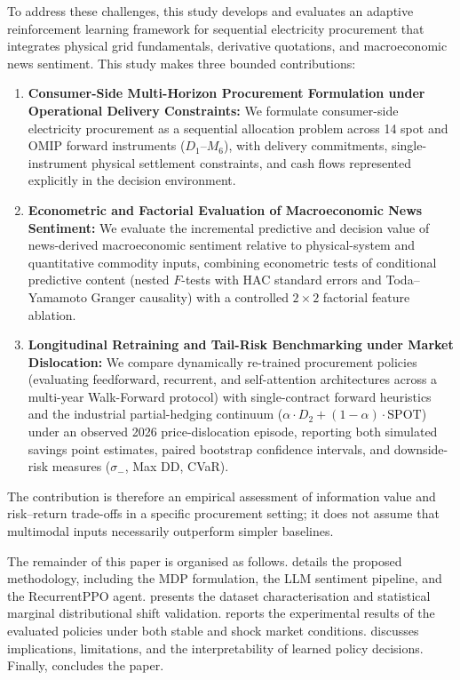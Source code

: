 To address these challenges, this study develops and evaluates an adaptive reinforcement learning framework for sequential electricity procurement that integrates physical grid fundamentals, derivative quotations, and macroeconomic news sentiment. This study makes three bounded contributions:
\begin{enumerate}
    \item \textbf{Consumer-Side Multi-Horizon Procurement Formulation under Operational Delivery Constraints:} We formulate consumer-side electricity procurement as a sequential allocation problem across 14 spot and OMIP forward instruments ($D_1$--$M_6$), with delivery commitments, single-instrument physical settlement constraints, and cash flows represented explicitly in the decision environment.
    \item \textbf{Econometric and Factorial Evaluation of Macroeconomic News Sentiment:} We evaluate the incremental predictive and decision value of news-derived macroeconomic sentiment relative to physical-system and quantitative commodity inputs, combining econometric tests of conditional predictive content (nested $F$-tests with HAC standard errors and Toda--Yamamoto Granger causality) with a controlled $2 \times 2$ factorial feature ablation.
    \item \textbf{Longitudinal Retraining and Tail-Risk Benchmarking under Market Dislocation:} We compare dynamically re-trained procurement policies (evaluating feedforward, recurrent, and self-attention architectures across a multi-year Walk-Forward protocol) with single-contract forward heuristics and the industrial partial-hedging continuum ($\alpha \cdot D_2 + (1-\alpha) \cdot \text{SPOT}$) under an observed 2026 price-dislocation episode, reporting both simulated savings point estimates, paired bootstrap confidence intervals, and downside-risk measures ($\sigma_-$, Max DD, CVaR).
\end{enumerate}
The contribution is therefore an empirical assessment of information value and risk--return trade-offs in a specific procurement setting; it does not assume that multimodal inputs necessarily outperform simpler baselines.

The remainder of this paper is organised as follows.
 details the proposed methodology, including the MDP formulation, 
the LLM sentiment pipeline, and the RecurrentPPO agent.
 presents the dataset characterisation and statistical
marginal distributional shift validation.
 reports the experimental results of the evaluated policies under both stable 
and shock market conditions.
 discusses implications, limitations, and the interpretability 
of learned policy decisions. Finally,  concludes the paper.
